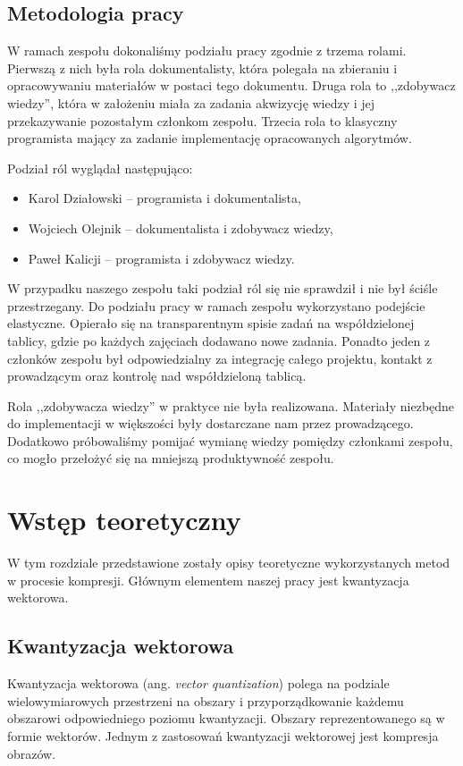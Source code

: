 \documentclass{article}
\begin{document}
\subsection{Metodologia pracy}

W ramach zespołu dokonaliśmy podziału pracy zgodnie z trzema rolami. Pierwszą z nich była rola dokumentalisty, która polegała na zbieraniu i opracowywaniu materiałów w postaci tego dokumentu. Druga rola to ,,zdobywacz wiedzy'', która w założeniu miała za zadania akwizycję wiedzy i jej przekazywanie pozostałym członkom zespołu. Trzecia rola to klasyczny programista mający za zadanie implementację opracowanych algorytmów.

Podział ról wyglądał następująco:

\begin{itemize}
    \item Karol Działowski -- programista i dokumentalista,
    \item Wojciech Olejnik -- dokumentalista i zdobywacz wiedzy,
    \item Paweł Kalicji -- programista i zdobywacz wiedzy.
\end{itemize}

W przypadku naszego zespołu taki podział ról się nie sprawdził i nie był ściśle przestrzegany. Do podziału pracy w ramach zespołu wykorzystano podejście elastyczne. Opierało się na transparentnym spisie zadań na współdzielonej tablicy, gdzie po każdych zajęciach dodawano nowe zadania. Ponadto jeden z członków zespołu był odpowiedzialny za integrację całego projektu, kontakt z prowadzącym oraz kontrolę nad współdzieloną tablicą.

Rola ,,zdobywacza wiedzy'' w praktyce nie była realizowana. Materiały niezbędne do implementacji w większości były dostarczane nam przez prowadzącego. Dodatkowo próbowaliśmy pomijać wymianę wiedzy pomiędzy członkami zespołu, co mogło przełożyć się na mniejszą produktywność zespołu.

\section{Wstęp teoretyczny}

W tym rozdziale przedstawione zostały opisy teoretyczne wykorzystanych metod w procesie kompresji. Głównym elementem naszej pracy jest kwantyzacja wektorowa.

\subsection{Kwantyzacja wektorowa}
Kwantyzacja wektorowa (ang. \emph{vector quantization}) polega na podziale wielowymiarowych przestrzeni na obszary i
przyporządkowanie każdemu obszarowi odpowiedniego poziomu kwantyzacji.
Obszary reprezentowanego są w formie wektorów.
Jednym z zastosowań kwantyzacji wektorowej jest kompresja obrazów.
\end{document}
